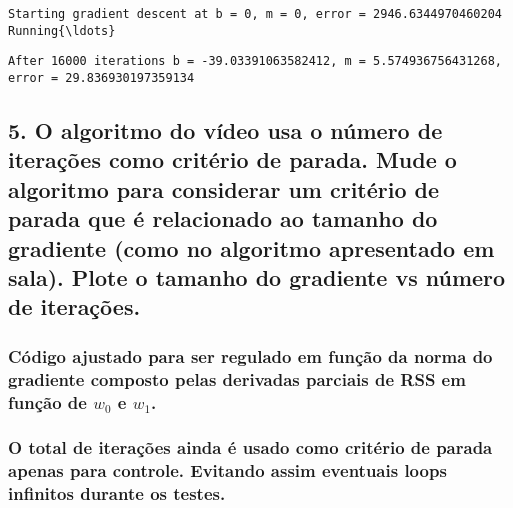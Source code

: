 \documentclass[11pt]{article}
\begin{document}
    \begin{Verbatim}[commandchars=\\\{\}]
Starting gradient descent at b = 0, m = 0, error = 2946.6344970460204
Running{\ldots}

    \end{Verbatim}

    
    
    \begin{Verbatim}[commandchars=\\\{\}]
After 16000 iterations b = -39.03391063582412, m = 5.574936756431268, error = 29.836930197359134

    \end{Verbatim}

    \subsection{5. O algoritmo do vídeo usa o número de iterações como
critério de parada. Mude o algoritmo para considerar um critério de
parada que é relacionado ao tamanho do gradiente (como no algoritmo
apresentado em sala). Plote o tamanho do gradiente vs número de
iterações.}\label{o-algoritmo-do-vuxeddeo-usa-o-nuxfamero-de-iterauxe7uxf5es-como-crituxe9rio-de-parada.-mude-o-algoritmo-para-considerar-um-crituxe9rio-de-parada-que-uxe9-relacionado-ao-tamanho-do-gradiente-como-no-algoritmo-apresentado-em-sala.-plote-o-tamanho-do-gradiente-vs-nuxfamero-de-iterauxe7uxf5es.}

\subsubsection{\texorpdfstring{Código ajustado para ser regulado em
função da norma do gradiente composto pelas derivadas parciais de RSS em
função de \(w_0\) e
\(w_1\).}{Código ajustado para ser regulado em função da norma do gradiente composto pelas derivadas parciais de RSS em função de w\_0 e w\_1.}}\label{cuxf3digo-ajustado-para-ser-regulado-em-funuxe7uxe3o-da-norma-do-gradiente-composto-pelas-derivadas-parciais-de-rss-em-funuxe7uxe3o-de-w_0-e-w_1.}

\subsubsection{O total de iterações ainda é usado como critério de
parada apenas para controle. Evitando assim eventuais loops infinitos
durante os
testes.}\label{o-total-de-iterauxe7uxf5es-ainda-uxe9-usado-como-crituxe9rio-de-parada-apenas-para-controle.-evitando-assim-eventuais-loops-infinitos-durante-os-testes.}
\end{document}
